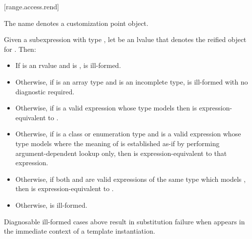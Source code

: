 [range.access.rend]{}
%

\pnum
The name  denotes a customization point
object.

\pnum
Given a subexpression  with type ,
let  be an lvalue that denotes the reified object for .
Then:

\begin{itemize}
\item
  If  is an rvalue and
   is ,
   is ill-formed.

\item
  Otherwise, if  is an array type and
   is an incomplete type,
   is ill-formed with no diagnostic required.

\item
  Otherwise, if 
  is a valid expression whose type models
  then  is expression-equivalent to
  .

\item
  Otherwise, if  is a class or enumeration type and
  is a valid expression whose type models
  where the meaning of  is established as-if by performing
  argument-dependent lookup only,
  then  is expression-equivalent to
  that expression.

\item
  Otherwise, if both  and 
  are valid expressions of the same type which models
  ,
  then  is expression-equivalent to
  .

\item
  Otherwise,  is ill-formed.
\end{itemize}

\pnum
\begin{note}
Diagnosable ill-formed cases above
result in substitution failure when 
appears in the immediate context of a template instantiation.
\end{note}

